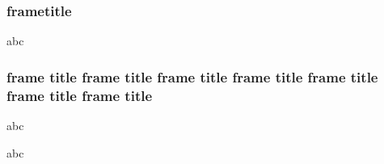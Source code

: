 \documentclass{beamer}
\begin{document}
\begin{frame}
    \frametitle{frametitle}
   abc
\end{frame} 

\begin{frame}
    \frametitle{frame title frame title  frame title  frame title frame title frame title frame title}
  abc
\end{frame} 

\begin{frame}
    abc
\end{frame} 
\end{document}
